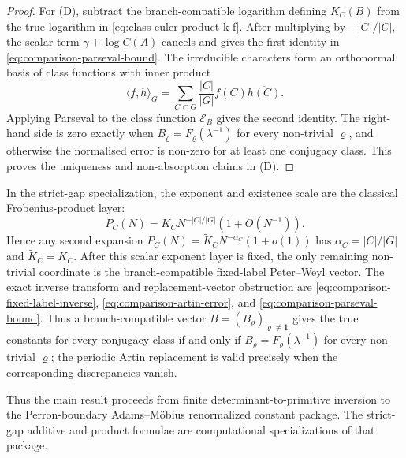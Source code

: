 \begin{proof}
  For \textup{(D)}, subtract the branch-compatible logarithm defining
  \(K_C(B)\) from the true logarithm in \eqref{eq:class-euler-product-k-f}.
  After multiplying by \(-|G|/|C|\), the scalar term
  \(\gamma+\log C(A)\) cancels and gives the first identity in
  \eqref{eq:comparison-parseval-bound}.  The irreducible characters form an
  orthonormal basis of class functions with inner product
  \[
    \langle f,h\rangle_G=
    \sum_{C\subset G}\frac{|C|}{|G|}f(C)\overline{h(C)}.
  \]
  Applying Parseval to the class function \(\mathscr E_B\) gives the second
  identity.  The right-hand side is zero exactly when
  \(B_\varrho=F_\varrho(\lambda^{-1})\) for every non-trivial
  \(\varrho\), and otherwise the normalised error is non-zero for at least
  one conjugacy class.  This proves the uniqueness and non-absorption claims
  in \textup{(D)}.

\end{proof}

\begin{remark}
  \label{cor:class-product-priority-boundary-unique}
  \label{thm:class-product-novelty-boundary}
  \label{cor:class-product-classical-layer-uniqueness}
  In the strict-gap specialization, the exponent and existence scale are the
  classical Frobenius-product layer:
  \[
    P_C(N)=K_C N^{-|C|/|G|}(1+O(N^{-1})).
  \]
  Hence any second expansion
  \(P_C(N)=\widetilde K_CN^{-\alpha_C}(1+o(1))\) has
  \(\alpha_C=|C|/|G|\) and \(\widetilde K_C=K_C\).  After this scalar
  exponent layer is fixed, the only remaining non-trivial coordinate is the
  branch-compatible fixed-label Peter--Weyl vector.  The exact inverse
  transform and replacement-vector obstruction are
  \eqref{eq:comparison-fixed-label-inverse},
  \eqref{eq:comparison-artin-error}, and
  \eqref{eq:comparison-parseval-bound}.  Thus a branch-compatible vector
  \(B=(B_\varrho)_{\varrho\ne\mathbf1}\) gives the true constants for every
  conjugacy class if and only if
  \(B_\varrho=F_\varrho(\lambda^{-1})\) for every non-trivial \(\varrho\);
  the periodic Artin replacement is valid precisely when the corresponding
  discrepancies vanish.
\end{remark}

Thus the main result proceeds from finite determinant-to-primitive inversion to
the Perron-boundary Adams--M\"obius renormalized constant package.  The
strict-gap additive and product formulae are computational specializations of
that package.

